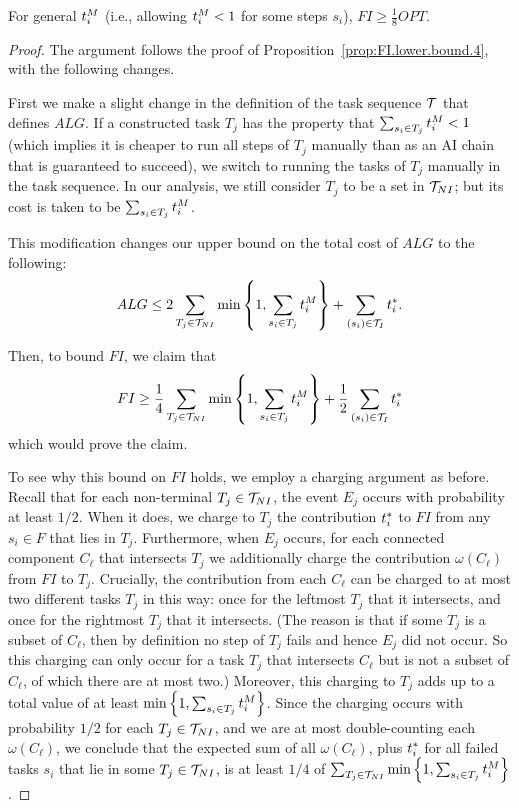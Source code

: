 \begin{proposition}
\label{prop:FI.lower.bound.8}
    For general $t^{M}_{i}$ (i.e., allowing $t^{M}_{i} < 1$ for some steps $s_i$), $FI \geq \frac{1}{8}OPT$.
\end{proposition}
\begin{proof}
    The argument follows the proof of Proposition~\ref{prop:FI.lower.bound.4}, with the following changes.

    First we make a slight change in the definition of the task sequence $\mathcal{T}$ that defines $ALG$.  
    If a constructed task $T_j$ has the property that $\sum_{s_i \in T_j} t^{M}_{i} < 1$ (which implies it is cheaper to run all steps of $T_j$ manually than as an AI chain that is guaranteed to succeed), we switch to running the tasks of $T_j$ manually in the task sequence.  
    In our analysis, we still consider $T_j$ to be a set in $\mathcal{T}_{NI}$; but its cost is taken to be $\sum_{s_i \in T_j} t^{M}_{i}$.

    This modification changes our upper bound on the total cost of $ALG$ to the following:
    \[ ALG \leq 2 \sum_{T_j \in \mathcal{T}_{NI}} \min\left\{1, \sum_{s_i \in T_j} t^{M}_{i} \right\} + \sum_{ (s_i) \in \mathcal{T}_I} t^*_{i}. \]

    Then, to bound $FI$, we claim that 
    \[ FI \geq \frac{1}{4}\sum_{T_j \in \mathcal{T}_{NI}} \min\left\{1, \sum_{s_i \in T_j} t^{M}_{i} \right\} + \frac{1}{2}\sum_{(s_i) \in \mathcal{T}_I} t^*_{i} \]
    which would prove the claim.

    To see why this bound on $FI$ holds, we employ a charging argument as before.  
    Recall that for each non-terminal $T_j \in \mathcal{T}_{NI}$, the event $E_j$ occurs with probability at least $1/2$.  
    When it does, we charge to $T_j$ the contribution $t^*_{i}$ to $FI$ from any $s_i \in F$ that lies in $T_j$.  
    Furthermore, when $E_j$ occurs, for each connected component $C_\ell$ that intersects $T_j$ we additionally charge the contribution $\omega(C_\ell)$ from $FI$ to $T_j$.   
    Crucially, the contribution from each $C_\ell$ can be charged to at most two different tasks $T_j$ in this way: once for the leftmost $T_j$ that it intersects, and once for the rightmost $T_j$ that it intersects.  
    (The reason is that if some $T_j$ is a subset of $C_\ell$, then by definition no step of $T_j$ fails and hence $E_j$ did not occur.  
    So this charging can only occur for a task $T_j$ that intersects $C_\ell$ but is not a subset of $C_\ell$, of which there are at most two.)  
    Moreover, this charging to $T_j$ adds up to a  total value of at least $\min\left\{1, \sum_{s_i \in T_j} t^{M}_{i} \right\}$.  
    Since the charging occurs with probability $1/2$ for each $T_j \in \mathcal{T}_{NI}$, and we are at most double-counting each $\omega(C_\ell)$, we conclude that the expected sum of all $\omega(C_\ell)$, plus $t^*_{i}$ for all failed tasks $s_i$ that lie in some $T_j \in \mathcal{T}_{NI}$, is at least $1/4$ of $\sum_{T_j \in \mathcal{T}_{NI}}\min\left\{1, \sum_{s_i \in T_j} t^{M}_{i} \right\}$.


\end{proof}
